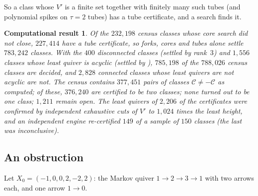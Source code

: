 \documentclass[11pt]{amsart}
\newtheorem{computation}[theorem]{Computational result}
\theoremstyle{definition}
\theoremstyle{remark}
\newcommand{\Vp}{V'}
\begin{document}
So a class whose $\Vp$ is a finite set together with finitely many such tubes (and polynomial spikes on $\tau=2$ tubes) has a tube certificate, and a search finds it.

\begin{computation}\label{comp:tubes}
Of the $232{,}198$ census classes whose core search did not close, $227{,}414$ have a tube certificate, so forks, cores and tubes alone settle $783{,}242$ classes. With the $400$ disconnected classes (settled by rank~$3$) and $1{,}556$ classes whose least quiver is acyclic (settled by \cite{AHJL}), $785{,}198$ of the $788{,}026$ census classes are decided, and $2{,}828$ connected classes whose least quivers are not acyclic are not. The census contains $377{,}451$ pairs of classes $\mathcal C\ne-\mathcal C$ as computed; of these, $376{,}240$ are certified to be two classes; none turned out to be one class; $1{,}211$ remain open. The least quivers of $2{,}206$ of the certificates were confirmed by independent exhaustive cuts of $\Vp$ to $1{,}024$ times the least height, and an independent engine re-certified $149$ of a sample of $150$ classes (the last was inconclusive).
\end{computation}

\subsection{An obstruction}
Let $X_0=(-1,0,0,2,-2,2)$: the Markov quiver $1\to2\to3\to1$ with two arrows each, and one arrow $1\to0$.
\end{document}
